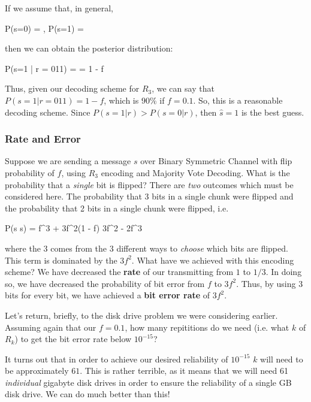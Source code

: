 If we assume that, in general,  
\begin{frml}
	P(s=0) = , 
	P(s=1) = 
\end{frml}
then  we can obtain the posterior distribution:
\begin{frml}
	P(s=1 | r = 011) = 
	= 1 - f
\end{frml}

Thus, given our decoding scheme for $R_3$, we can say that $P(s = 1 | r = 011) = 1 - f$, which
is $90\%$ if $f = 0.1$. So, this is a reasonable decoding scheme.
Since $P(s=1|r) > P(s=0|r)$, then $\hat s = 1$ is the best guess.

\subsubsection{Rate and Error}

Suppose we are sending a message $s$ over  Binary Symmetric Channel with flip
probability of $f$, using $R_3$ encoding and Majority Vote Decoding. 
What is the probability
that a \textit{single} bit is flipped? There are \textit{two} outcomes which must
be considered here. The probability that 3 bits in a single chunk were flipped
and the probability that 2 bits in a single chunk were flipped, i.e.
\begin{frml}
	 P(\hat s \neq s) = f^3 + 3f^2(1 - f) \approx 3f^2 - 2f^3
\end{frml}
where the $3$ comes from the $3$ different ways to \textit{choose} which bits are
flipped. This term is dominated by the $3f^2$. What have we achieved with this
encoding scheme? 
We have decreased the \textbf{rate} of our transmitting from $1$ to $1/3$. In 
doing so, we have decreased the probability of bit error from $f$ to $3f^2$.
Thus, by using 3 bits for every bit, we have achieved a \textbf{bit error rate} 
of $3f^2$.

Let's return, briefly, to the disk drive problem we were considering earlier.
Assuming again that our $f=0.1$, how many repititions do we need (i.e. what $k$ of
$R_k$) to get the bit error rate below $10^{-15}$?

It turns out that in order to achieve our desired
reliability of $10^{-15}$ 
$k$ will need to be approximately $61$. This is rather terrible, as it means
that we will need 61 \textit{individual} gigabyte disk drives in order to ensure
the reliability of a single GB disk drive.
We can do much better than this!

